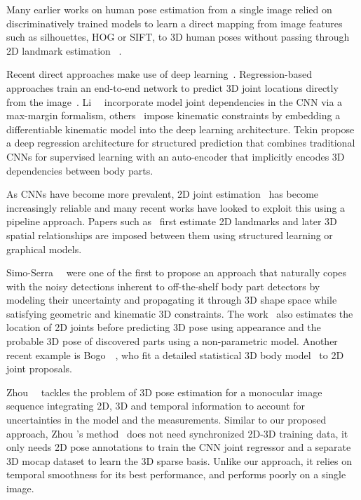 \documentclass[10pt,twocolumn,letterpaper]{article}
\begin{document}
Many earlier works on human pose estimation from a single image
relied on discriminatively trained models to learn a direct mapping
from image features such as silhouettes, HOG or SIFT, to 3D human
poses without passing through 2D landmark estimation
~\cite{agarwal2006recovering,Elgammal:Lee:CVPR:2004,conf/mlmi/EkTL07,Mori:Malik:PAMI:2006,Sigal:etal:CVPR:2009}.

 Recent direct approaches make use of deep
learning~\cite{li20143d, li2015maximum, tompson2014joint,
  toshev2014deeppose}. Regression-based approaches train an end-to-end network 
 to predict 3D joint locations directly from the
image~\cite{toshev2014deeppose, li20143d,
  li2015maximum,zhou2016deep}. Li~\etal~\cite{li2015maximum} incorporate
model joint dependencies in the CNN via a max-margin formalism,
others~\cite{zhou2016deep} impose kinematic constraints by embedding a
differentiable kinematic model into the deep learning architecture.
 Tekin \etal \cite{tekin2016structured} propose a deep
regression architecture for structured prediction that combines
traditional CNNs for supervised learning with an auto-encoder that
implicitly encodes 3D dependencies between body parts.

 
As CNNs have become more prevalent, 2D joint
estimation~\cite{wei2016convolutional} has become increasingly
reliable and many recent works have looked to exploit this using a
pipeline approach. Papers such as~\cite{chen2014articulated,
  jain2013learning, tompson2014joint, pfister2015flowing} first
estimate 2D landmarks and later 3D spatial relationships are imposed
between them using structured learning or graphical models.

Simo-Serra~\etal~\cite{simo2012single} were one of the first to
propose an approach that naturally copes with the noisy
detections inherent to off-the-shelf body part detectors by modeling
their uncertainty and propagating it through 3D shape space while
satisfying  geometric and kinematic 3D constraints. The work~\cite{sanzari2016bayesian} also estimates the
location of 2D joints before predicting 3D pose using appearance and
the probable 3D pose of discovered parts using a non-parametric model.  Another recent example is
Bogo~\etal~\cite{bogo2016keep}, who fit a detailed statistical 3D body
model~\cite{loper2015smpl} to 2D joint proposals.



Zhou~\etal~\cite{zhou2015sparseness} tackles the
problem of 3D pose estimation for a monocular image sequence
integrating 2D, 3D and temporal information to account for
uncertainties in the model and the measurements. Similar to our proposed approach, Zhou \etal's method~\cite{zhou2015sparseness}  does not need
synchronized 2D-3D training data, \ie it only needs 2D pose
annotations to train the CNN joint regressor and a separate 3D mocap
dataset to learn the 3D sparse basis.  Unlike our approach, it relies
on temporal smoothness for its best performance, and performs poorly on 
a single image.
\end{document}
